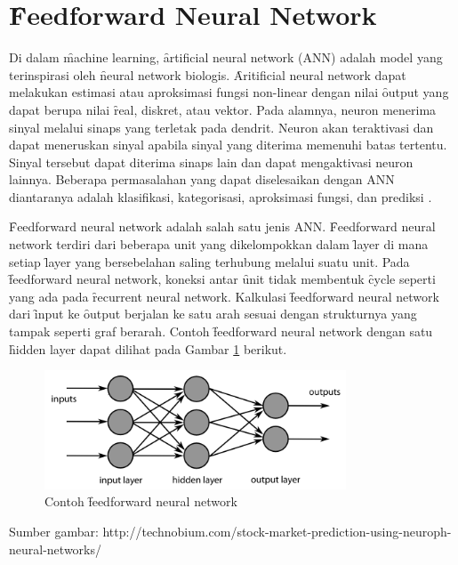 \section{\f{Feedforward Neural Network}} \label{fnn}
Di dalam \f{machine learning}, \f{artificial neural network} (ANN) adalah model yang terinspirasi oleh \f{neural network} biologis. \f{Aritificial neural network} dapat melakukan estimasi atau aproksimasi fungsi non-linear dengan nilai \f{output} yang dapat berupa nilai \f{real}, diskret, atau vektor. Pada alamnya, neuron menerima sinyal melalui sinaps yang terletak pada dendrit. Neuron akan teraktivasi dan dapat meneruskan sinyal apabila sinyal yang diterima memenuhi batas tertentu. Sinyal tersebut dapat diterima sinaps lain dan dapat mengaktivasi neuron lainnya. Beberapa permasalahan yang dapat diselesaikan dengan ANN diantaranya adalah klasifikasi, kategorisasi, aproksimasi fungsi, dan prediksi .

\f{Feedforward neural network} adalah salah satu jenis ANN. \f{Feedforward neural network} terdiri dari beberapa unit yang dikelompokkan dalam \f{layer} di mana setiap \f{layer} yang bersebelahan saling terhubung melalui suatu unit. Pada \f{feedforward neural network}, koneksi antar \f{unit} tidak membentuk \f{cycle} seperti yang ada pada \f{recurrent neural network}. Kalkulasi \f{feedforward neural network} dari \f{input} ke \f{output} berjalan ke satu arah sesuai dengan strukturnya yang tampak seperti graf berarah. Contoh \f{feedforward neural network} dengan satu \f{hidden layer} dapat dilihat pada Gambar \ref{fig:fnn} berikut.

\begin{figure}
	\centering
	\includegraphics[width=0.8\textwidth,height=0.3\textwidth]
	{pics/fnn.png}
	\caption{Contoh \f{feedforward neural network}}
	\label{fig:fnn}
\end{figure}
\vspace{-1.2cm}
\begin{center}
	{\small Sumber gambar: http://technobium.com/stock-market-prediction-using-neuroph-neural-networks/}
\end{center}


